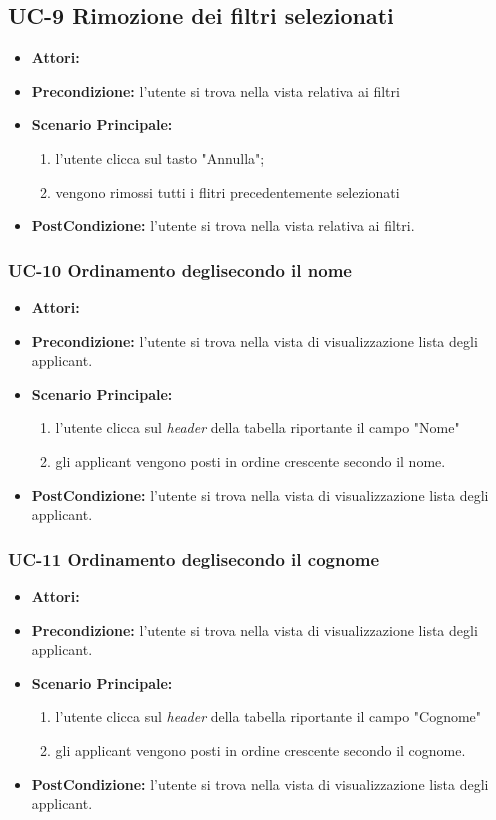 \subsection{UC-9 Rimozione dei filtri selezionati}
\begin{itemize}
\item \textbf{Attori:}\loggedusr
\item \textbf{Precondizione:} l'utente si trova nella vista relativa ai filtri
\item \textbf{Scenario Principale:}
\begin{enumerate}
	\item l'utente clicca sul tasto "Annulla";
	\item vengono rimossi tutti i flitri precedentemente selezionati
\end{enumerate}
\item \textbf{PostCondizione:} l'utente si trova nella vista relativa ai filtri.
\end{itemize}


\subsubsection{UC-10 Ordinamento degli\applicant secondo il nome}
\begin{itemize}
\item \textbf{Attori:}\loggedusr
\item \textbf{Precondizione:} l'utente si trova nella vista di visualizzazione lista degli applicant.
\item \textbf{Scenario Principale:}
\begin{enumerate}
	\item l'utente clicca sul \textit{header} della tabella riportante il campo "Nome"
	\item gli applicant vengono posti in ordine crescente secondo il nome.
\end{enumerate}
\item \textbf{PostCondizione:}  l'utente si trova nella vista di visualizzazione lista degli applicant.
\end{itemize}

\subsubsection{UC-11 Ordinamento degli\applicant secondo il cognome}
\begin{itemize}
	\item \textbf{Attori:}\loggedusr
	\item \textbf{Precondizione:} l'utente si trova nella vista di visualizzazione lista degli applicant.
	\item \textbf{Scenario Principale:}
	\begin{enumerate}
		\item l'utente clicca sul \textit{header} della tabella riportante il campo "Cognome"
		\item gli applicant vengono posti in ordine crescente secondo il cognome.
	\end{enumerate}
	\item \textbf{PostCondizione:}  l'utente si trova nella vista di visualizzazione lista degli applicant.
\end{itemize}

